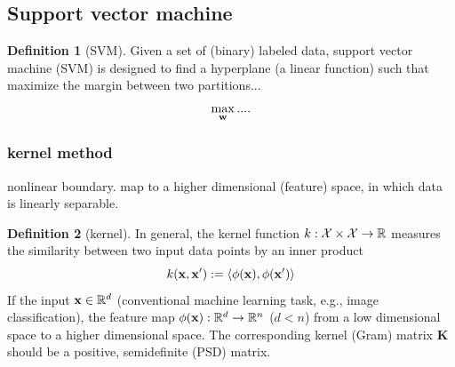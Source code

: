 \documentclass[
10pt,
aps,
pra,
linenumbers,
floatfix,
]{revtex4-2}
\theoremstyle{plain}
\theoremstyle{definition}
\newtheorem{definition}{Definition}
\newcommand{\kernel}{k}
\begin{document}
\subsection{Support vector machine}\label{sec:svm}
\begin{definition}[SVM]\label{def:svm}
	Given a set of (binary) labeled data,
	support vector machine (SVM) is designed to
	find a hyperplane (a linear function) such that maximize the margin between two partitions...
	\begin{equation}
		\max_{\vb{w}} 
		....
	\end{equation}
\end{definition}

\subsubsection{kernel method}
nonlinear boundary. map to a higher dimensional (feature) space, in which data is linearly separable.
\begin{definition}[kernel]\label{def:kernel}
	In general, the kernel function $\kernel:\mathcal{X}\times \mathcal{X} \to \realnumber$ measures the similarity between two input data points by an inner product
	\begin{equation}
		\kernel (\vbx,\vbx') : = \expval{\phi(\vbx),\phi(\vbx')}
	\end{equation}
	If the input $\vb{x}\in \mathbb{R}^d$ (conventional machine learning task, e.g., image classification), the feature map $\phi(\vb{x}): \mathbb{R}^d\to \mathbb{R}^n$ ($d < n$) from a low dimensional space to a higher dimensional space.
	The corresponding kernel (Gram) matrix $\mathbf{K}$ should be a positive, semidefinite (PSD) matrix.
\end{definition}
\end{document}
